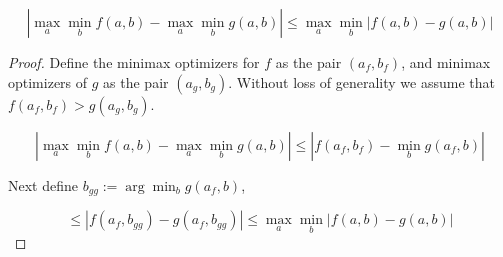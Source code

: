 \documentclass[letterpaper, 10 pt, conference]{ieeeconf}
\begin{document}
\begin{lemma}\label{lem:maxmin}
\begin{equation} 
|\max_a \min_b f(a,b) -\max_a \min_b g(a,b)| \leq \max_a \min_b |f(a,b) - g(a,b)|
\end{equation}
\end{lemma}

\begin{proof}
Define the minimax optimizers for $f$ as the pair $(a_f,b_f)$, and minimax optimizers of $g$ as the pair $(a_g, b_g)$. Without loss of generality we assume that $f(a_f,b_f) > g(a_g,b_g)$.

\begin{equation*}
|\max_a \min_b f(a,b) -\max_a \min_b g(a,b)| \leq |f(a_f,b_f) - \min_b g(a_f,b)|
\end{equation*}

\noindent Next define $b_{gg} :=\arg\min_b g(a_f,b)$,

\begin{equation*}
\leq |f(a_f,b_{gg}) - g(a_f,b_{gg})| \leq \max_a \min_b |f(a,b) - g(a,b)|
\end{equation*}
\end{proof}
\end{document}
